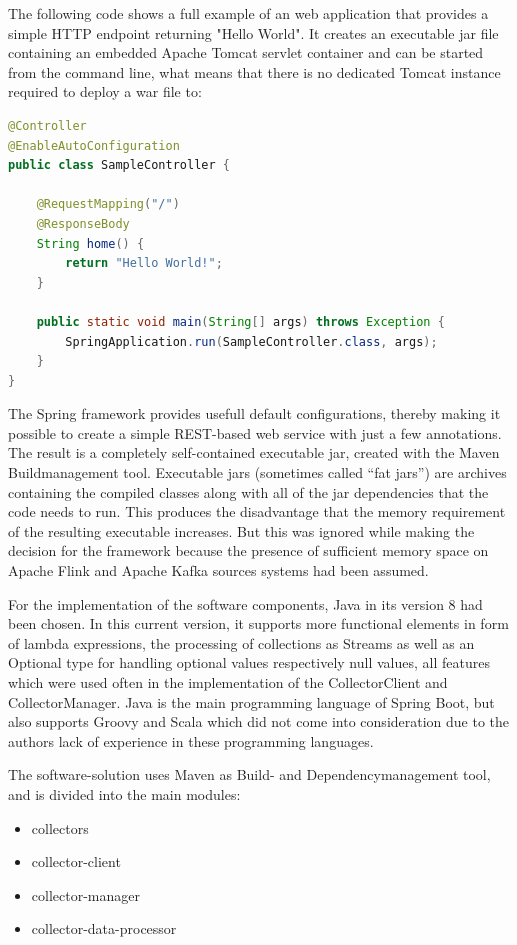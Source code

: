 The following code shows a full example of an web application that provides a simple
HTTP endpoint returning "Hello World". It creates an executable jar file containing
an embedded Apache Tomcat servlet container and can be started from the command line, what means that there is no
dedicated Tomcat instance required to deploy a war file to:
\begin{lstlisting}[caption={Spring Boot "Hello World"}, captionpos=b, label={lst:spring-boot-hello-world},language=Java]
@Controller
@EnableAutoConfiguration
public class SampleController {

    @RequestMapping("/")
    @ResponseBody
    String home() {
        return "Hello World!";
    }

    public static void main(String[] args) throws Exception {
        SpringApplication.run(SampleController.class, args);
    }
}
\end{lstlisting}

The Spring framework provides usefull default configurations, thereby making it possible to create a simple REST-based web service
with just a few annotations. The result is a completely self-contained executable jar, created with the Maven
Buildmanagement tool. Executable jars (sometimes called “fat jars”) are archives containing the compiled classes along with
all of the jar dependencies that the code needs to run. This produces the disadvantage that the memory requirement of the
resulting executable increases. But this was ignored while making the decision for the framework because the presence of
sufficient memory space on Apache Flink and Apache Kafka sources systems had been assumed.

For the implementation of the software components, Java in its version 8 had been chosen. In this current version,
it supports more functional elements in form of lambda expressions, the processing of collections as Streams as well
as an Optional type for handling optional values respectively null values, all features which were used often in the
implementation of the CollectorClient and CollectorManager. Java is the main programming language of Spring Boot, but also
supports Groovy and Scala which did not come into consideration due to the authors lack of experience in these programming
languages.

The software-solution uses Maven as Build- and Dependencymanagement tool, and is divided into the main modules:

\begin{itemize}
	\item collectors
	\item collector-client
	\item collector-manager
	\item collector-data-processor
\end{itemize}

